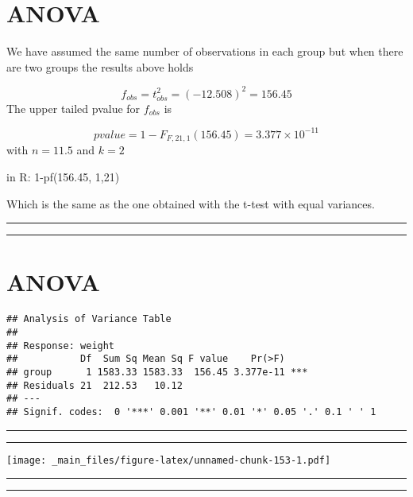 \documentclass[
]{book}
\begin{document}
\hypertarget{anova-1}{%
\section{ANOVA}\label{anova-1}}

We have assumed the same number of observations in each group but when there are two groups the results above holds

\[f_{obs}=t_{obs}^2=(−12.508)^2=156.45\]
The upper tailed pvalue for \(f_{obs}\) is

\[pvalue=1-F_{F,21,1}(156.45)=3.377 \times 10^{-11}\] with \(n=11.5\) and \(k=2\)

in R: 1-pf(156.45, 1,21)

Which is the same as the one obtained with the t-test with equal variances.

\begin{center}\rule{0.5\linewidth}{0.5pt}\end{center}

\begin{center}\rule{0.5\linewidth}{0.5pt}\end{center}

\hypertarget{anova-2}{%
\section{ANOVA}\label{anova-2}}

\begin{verbatim}
## Analysis of Variance Table
## 
## Response: weight
##           Df  Sum Sq Mean Sq F value    Pr(>F)    
## group      1 1583.33 1583.33  156.45 3.377e-11 ***
## Residuals 21  212.53   10.12                      
## ---
## Signif. codes:  0 '***' 0.001 '**' 0.01 '*' 0.05 '.' 0.1 ' ' 1
\end{verbatim}

\begin{center}\rule{0.5\linewidth}{0.5pt}\end{center}

\begin{center}\rule{0.5\linewidth}{0.5pt}\end{center}

\texttt{[image: \_main\_files/figure-latex/unnamed-chunk-153-1.pdf]}

\begin{center}\rule{0.5\linewidth}{0.5pt}\end{center}

\begin{center}\rule{0.5\linewidth}{0.5pt}\end{center}
\end{document}
